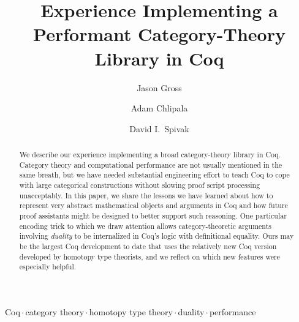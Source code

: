 \documentclass[runningheads]{llncs}
\begin{document}
\pagestyle{headings}


\mainmatter

\title{Experience Implementing a Performant Category-Theory Library in Coq}

%
\author{Jason Gross \and Adam Chlipala \and David I.~Spivak}
%
%
%

\maketitle

\begin{abstract}
  We describe our experience implementing a broad category-theory library in Coq.  Category theory and computational performance are not usually mentioned in the same breath, but we have needed substantial engineering effort to teach Coq to cope with large categorical constructions without slowing proof script processing unacceptably.  In this paper, we share the lessons we have learned about how to represent very abstract mathematical objects and arguments in Coq and how future proof assistants might be designed to better support such reasoning.  One particular encoding trick to which we draw attention allows category-theoretic arguments involving \emph{duality} to be internalized in Coq's logic with definitional equality.  Ours may be the largest Coq development to date that uses the relatively new Coq version developed by homotopy type theorists, and we reflect on which new features were especially helpful.
\end{abstract}



\keywords
Coq\,$\cdot$\,category theory\,$\cdot$\,homotopy type theory\,$\cdot$\,duality\,$\cdot$\,performance
\end{document}
